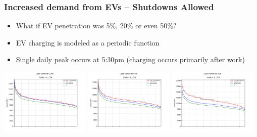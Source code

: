 \documentclass[xcolor=dvipsnames]{beamer}
\begin{document}
\begin{frame}  \frametitle{Increased demand from EVs -- Shutdowns Allowed}
\begin{itemize}
  \item What if EV penetration was 5\%, 20\% or even 50\%?
  \item EV charging is modeled as a periodic function
  \item Single daily peak occurs at 5:30pm (charging occurs primarily after work)
\end{itemize}

\includegraphics[width=0.32\textwidth]{includes/LDC_5pct_EVs_IL_CHI.png}    
\includegraphics[width=0.32\textwidth]{includes/LDC_20pct_EVs_IL_CHI.png} 
\includegraphics[width=0.32\textwidth]{includes/LDC_50pct_EVs_IL_CHI.png} 
      
\end{frame}
\end{document}
